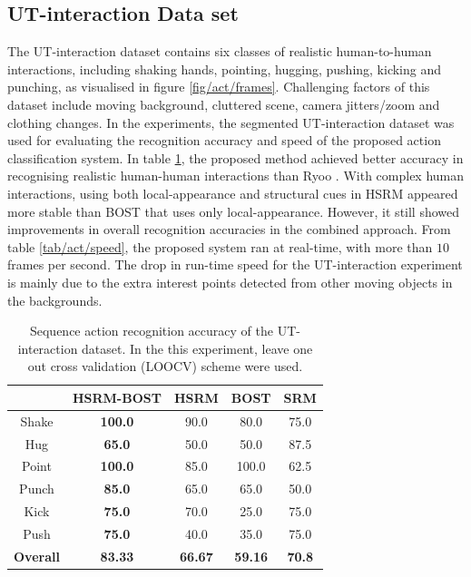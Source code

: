 \subsection{UT-interaction Data set}
The UT-interaction dataset contains six classes of realistic human-to-human interactions, including shaking hands, pointing, hugging, pushing, kicking and punching, as visualised in figure \ref{fig/act/frames}. 
Challenging factors of this dataset include moving background, cluttered scene, camera jitters/zoom and clothing changes. 
In the experiments, the segmented UT-interaction dataset was used for evaluating the recognition accuracy and speed of the proposed action classification system. 
In table \ref{tab/act/utcompare}, the proposed method achieved better accuracy in recognising realistic human-human interactions than Ryoo \etal \cite{Ryoo2009}. 
With complex human interactions, using both local-appearance and structural cues in HSRM appeared more stable than BOST that uses only local-appearance. 
However, it still showed improvements in overall recognition accuracies in the combined approach. 
From table \ref{tab/act/speed}, the proposed system ran at real-time, with more than $10$ frames per second. 
The drop in run-time speed for the UT-interaction experiment is mainly due to the extra interest points detected from other moving objects in the backgrounds.

\begin{table}
	\centering
	\begin{tabular}{|c|c|c|c|c|}
		\hline 
		\backslashbox{\textbf{Action}}{\textbf{Method}} & \textbf{\color{blue}HSRM-BOST} & \textbf{HSRM} & \textbf{BOST} & \textbf{SRM}\cite{Ryoo2009} \\
		\hline 
		Shake & \textbf{\color{blue}100.0} & 90.0 & 80.0 & 75.0 \\ 
		Hug & \textbf{\color{blue}65.0} & 50.0 & 50.0 & 87.5 \\ 
		Point & \textbf{\color{blue}100.0} & 85.0 & 100.0 & 62.5 \\ 
		Punch & \textbf{\color{blue}85.0} & 65.0 & 65.0 & 50.0 \\ 
		Kick & \textbf{\color{blue}75.0} & 70.0 & 25.0 & 75.0 \\ 
		Push & \textbf{\color{blue}75.0} & 40.0 & 35.0 & 75.0 \\ 
		\hline 	
		\textbf{ Overall } & \textbf{\color{blue}83.33} & \textbf{66.67} & \textbf{59.16} & \textbf{70.8} \\ 
		\hline 
	\end{tabular}
	\caption{Sequence action recognition accuracy of the UT-interaction dataset. In the this experiment, leave one out cross validation (LOOCV) scheme were used.}
	\label{tab/act/utcompare}
\end{table}

